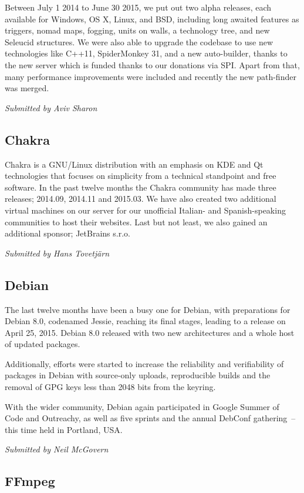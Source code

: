 \documentclass[letterpaper]{report}
\begin{document}
Between July 1 2014 to June 30 2015, we put out two alpha releases, each
available for Windows, OS X, Linux, and BSD, including long awaited
features as triggers, nomad maps, fogging, units on walls, a technology
tree, and new Seleucid structures. We were also able to upgrade the
codebase to use new technologies like C++11, SpiderMonkey 31, and a new
auto-builder, thanks to the new server which is funded thanks to our
donations via SPI. Apart from that, many performance improvements were
included and recently the new path-finder was merged.

{\em Submitted by Aviv Sharon}

\subsection{Chakra}

Chakra is a GNU/Linux distribution with an emphasis on KDE and Qt
technologies that focuses on simplicity from a technical standpoint and
free software.  In the past twelve months the Chakra community has made
three releases; 2014.09, 2014.11 and 2015.03.  We have also created two
additional virtual machines on our server for our unofficial Italian- and
Spanish-speaking communities to host their websites.  Last but not least,
we also gained an additional sponsor; JetBrains s.r.o.

{\em Submitted by Hans Tovetjärn}

\subsection{Debian}

The last twelve months have been a busy one for Debian, with
preparations for Debian 8.0, codenamed Jessie, reaching its final stages,
leading to a release on April 25, 2015. Debian 8.0 released with two
new architectures and a whole host of updated packages.

Additionally, efforts were started to increase the reliability and
verifiability of packages in Debian with source-only uploads, reproducible
builds and the removal of GPG keys less than 2048 bits from the keyring.

With the wider community, Debian again participated in Google Summer of
Code and Outreachy, as well as five sprints and the annual DebConf
gathering~--this time held in Portland, USA.

{\em Submitted by Neil McGovern}

\subsection{FFmpeg}
\end{document}
